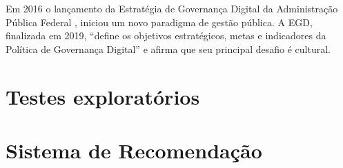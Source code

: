 Em 2016 o lançamento da Estratégia de Governança Digital da Administração Pública Federal \cite{BRASIL}, iniciou um novo paradigma de gestão pública. A EGD, finalizada em 2019,
“define os objetivos estratégicos, metas e indicadores da Política de Governança Digital” e afirma que seu principal desafio é cultural.



\section{Testes exploratórios}


\section{Sistema de Recomendação}
